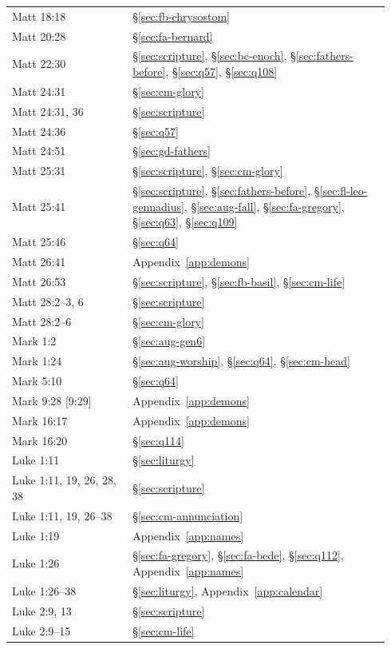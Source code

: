 \begin{longtable}{>{\raggedright\arraybackslash}p{0.30\linewidth}>{\raggedright\arraybackslash}p{0.64\linewidth}}
Matt 18:18 & \S\ref{sec:fb-chrysostom}\\
Matt 20:28 & \S\ref{sec:fa-bernard}\\
Matt 22:30 & \S\ref{sec:scripture}, \S\ref{sec:bc-enoch}, \S\ref{sec:fathers-before}, \S\ref{sec:q57}, \S\ref{sec:q108}\\
Matt 24:31 & \S\ref{sec:cm-glory}\\
Matt 24:31, 36 & \S\ref{sec:scripture}\\
Matt 24:36 & \S\ref{sec:q57}\\
Matt 24:51 & \S\ref{sec:gd-fathers}\\
Matt 25:31 & \S\ref{sec:scripture}, \S\ref{sec:cm-glory}\\
Matt 25:41 & \S\ref{sec:scripture}, \S\ref{sec:fathers-before}, \S\ref{sec:fl-leo-gennadius}, \S\ref{sec:aug-fall}, \S\ref{sec:fa-gregory}, \S\ref{sec:q63}, \S\ref{sec:q109}\\
Matt 25:46 & \S\ref{sec:q64}\\
Matt 26:41 & Appendix~\ref{app:demons}\\
Matt 26:53 & \S\ref{sec:scripture}, \S\ref{sec:fb-basil}, \S\ref{sec:cm-life}\\
Matt 28:2--3, 6 & \S\ref{sec:scripture}\\
Matt 28:2--6 & \S\ref{sec:cm-glory}\\
Mark 1:2 & \S\ref{sec:aug-gen6}\\
Mark 1:24 & \S\ref{sec:aug-worship}, \S\ref{sec:q64}, \S\ref{sec:cm-head}\\
Mark 5:10 & \S\ref{sec:q64}\\
Mark 9:28 [9:29] & Appendix~\ref{app:demons}\\
Mark 16:17 & Appendix~\ref{app:demons}\\
Mark 16:20 & \S\ref{sec:q114}\\
Luke 1:11 & \S\ref{sec:liturgy}\\
Luke 1:11, 19, 26, 28, 38 & \S\ref{sec:scripture}\\
Luke 1:11, 19, 26--38 & \S\ref{sec:cm-annunciation}\\
Luke 1:19 & Appendix~\ref{app:names}\\
Luke 1:26 & \S\ref{sec:fa-gregory}, \S\ref{sec:fa-bede}, \S\ref{sec:q112}, Appendix~\ref{app:names}\\
Luke 1:26--38 & \S\ref{sec:liturgy}, Appendix~\ref{app:calendar}\\
Luke 2:9, 13 & \S\ref{sec:scripture}\\
Luke 2:9--15 & \S\ref{sec:cm-life}\\

\end{longtable}
